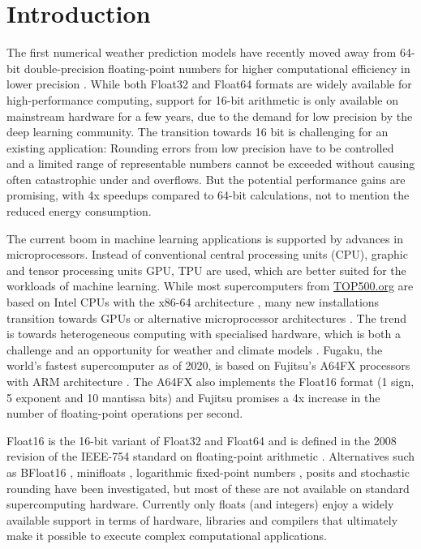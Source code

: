 \section{Introduction}

The first numerical weather prediction models have recently moved away from 64-bit double-precision floating-point numbers
for higher computational efficiency in lower precision \citep{Govett2017,Nakano2018,Rudisuhli2013,Vana2017}. While both Float32
and Float64 formats are widely available for high-performance computing, support for 16-bit arithmetic is only available on mainstream
hardware for a few years, due to the demand for low precision by the deep learning community. The transition towards 16 bit is challenging
for an existing application: Rounding errors from low precision have to be controlled and a limited range of representable numbers
cannot be exceeded without causing often catastrophic under and overflows. But the potential performance gains are promising,
with 4x speedups compared to 64-bit calculations, not to mention the reduced energy consumption.

The current boom in machine learning applications is supported by advances in microprocessors. Instead of conventional central
processing units (CPU), graphic and tensor processing units GPU, TPU \citep{Jouppi2018,Jouppi2018a,Jouppi2017,Steinkraus2005}
are used, which are better suited for the workloads of machine learning. While most supercomputers from \href{https://top500.org}{TOP500.org}
are based on Intel CPUs with the x86-64 architecture \citep{Dongarra2011}, many new installations transition towards GPUs or alternative
microprocessor architectures \citep{Zheng2020}. The trend is towards heterogeneous computing with specialised hardware, which is
both a challenge and an opportunity for weather and climate models \citep{Bauer2021,Bauer2021a}. Fugaku, the world’s fastest supercomputer
as of 2020, is based on Fujitsu’s A64FX processors with ARM architecture \citep{Odajima2020,Sato2020}. The A64FX also implements the
Float16 format (1 sign, 5 exponent and 10 mantissa bits) and Fujitsu promises a 4x increase in the number of floating-point
operations per second. 

Float16 is the 16-bit variant of Float32 and Float64 and is defined in the 2008 revision of the IEEE-754 standard on floating-point arithmetic
\citep{IEEE1985,IEEE2008}. Alternatives such as BFloat16 \citep{Burgess2019, Kalamkar2019}, minifloats \citep{Fox2020}, logarithmic
fixed-point numbers \citep{Johnson2020,Johnson2018,Sun2020}, posits
\citep{Gustafson2017a,Chaurasiya2018,Klower2019a,Klower2020a,Langroudi2019,Zhang2020} and stochastic rounding
\citep{Croci2020,Hopkins2020,Mikaitis2020,Paxton2021} have been investigated, but most of these are not available on
standard supercomputing hardware. Currently only floats (and integers) enjoy a widely available support in terms of hardware,
libraries and compilers that ultimately make it possible to execute complex computational applications.

